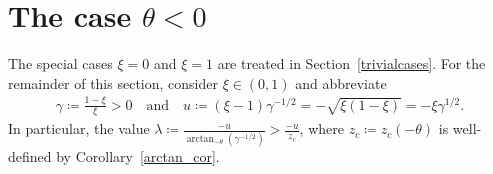 \documentclass[12pt]{article}
\newcommand{\1}{\mathds{1}}
\theoremstyle{definition}
\theoremstyle{plain}
\theoremstyle{remark}
\begin{document}
\section{The case \texorpdfstring{$\theta<0$}{theta<0}}\label{proofs_theta_neg}
The special cases $\xi=0$ and $\xi=1$ are treated in Section~\ref{trivialcases}. For the remainder of this section, consider $\xi\in(0,1)$ and abbreviate 
\begin{align*}
    \gamma\coloneqq\frac{1-\xi}{\xi}> 0\quad\text{and}\quad u\coloneqq (\xi-1)\gamma^{-1/2}=-\sqrt{\xi(1-\xi)}=-\xi \gamma^{1/2}.
\end{align*}
In particular, the value $\lambda\coloneqq \frac{-u}{\arctan_{-\theta}\left(\gamma^{-1/2}\right)}>\frac{-u}{z_c}$, where $z_c\coloneqq z_c(-\theta)$ is well-defined by Corollary~\ref{arctan_cor}.
\end{document}
